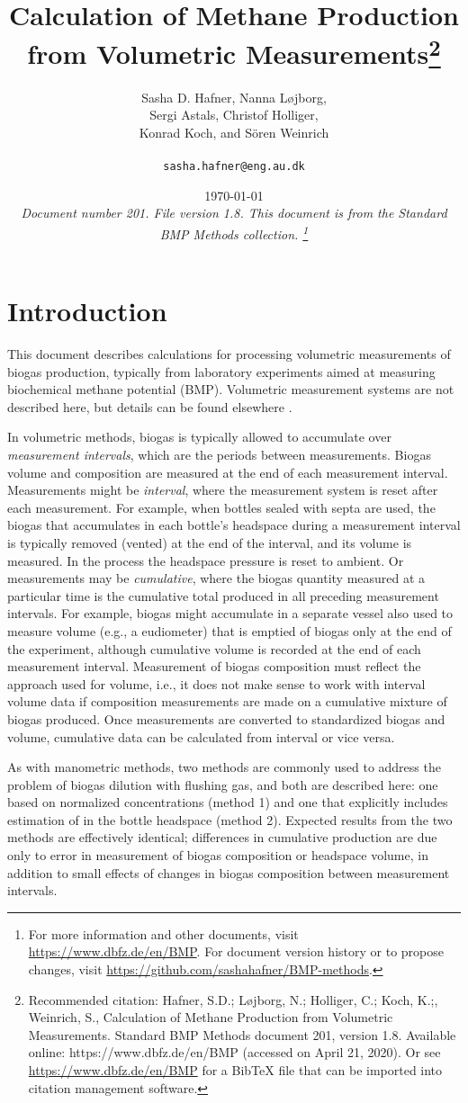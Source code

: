 \documentclass[]{article}
\title {Calculation of Methane Production from Volumetric Measurements\footnote{
  Recommended citation: 
Hafner, S.D.; L{\o}jborg, N.; Holliger, C.; Koch, K.;, Weinrich, S., Calculation of Methane Production from Volumetric Measurements. Standard BMP Methods document 201, version 1.8. Available online: https://www.dbfz.de/en/BMP (accessed on April 21, 2020).
\newline
  Or see \url{https://www.dbfz.de/en/BMP} for a BibTeX file that can be imported into citation management software.
}}
\author{Sasha D. Hafner, Nanna L{\o}jborg, \\ Sergi Astals, Christof Holliger, \\ Konrad Koch, and S{\"o}ren Weinrich\\
\\
\texttt{sasha.hafner@eng.au.dk}
}
\date{\today \\
\bigskip
\textit{
  Document number 201.
  File version 1.8. 
  This document is from the Standard BMP Methods collection.
    \footnote{For more information and other documents, visit \url{https://www.dbfz.de/en/BMP}. 
    For document version history or to propose changes, visit \url{https://github.com/sashahafner/BMP-methods}.}
}
}
\begin{document}
\maketitle

\section{Introduction}
This document describes calculations for processing volumetric measurements of biogas production, typically from laboratory experiments aimed at measuring biochemical methane potential (BMP).
Volumetric measurement systems are not described here, but details can be found elsewhere \citep{owenBioassayMonitoringBiochemical1979,rozziMethodsAssessingMicrobial2004,vdiFermentationOrganicMaterials2016}.

In volumetric methods, biogas is typically allowed to accumulate over \textit{measurement intervals}, which are the periods between measurements.
Biogas volume and composition are measured at the end of each measurement interval.
Measurements might be \textit{interval}, where the measurement system is reset after each measurement.
For example, when bottles sealed with septa are used, the biogas that accumulates in each bottle's headspace during a measurement interval is typically removed (vented) at the end of the interval, and its volume is measured. 
In the process the headspace pressure is reset to ambient.
Or measurements may be \textit{cumulative}, where the biogas quantity measured at a particular time is the cumulative total produced in all preceding measurement intervals.
For example, biogas might accumulate in a separate vessel also used to measure volume (e.g., a eudiometer) that is emptied of biogas only at the end of the experiment, although cumulative volume is recorded at the end of each measurement interval.
Measurement of biogas composition must reflect the approach used for volume, i.e., it does not make sense to work with interval volume data if composition measurements are made on a cumulative mixture of biogas produced.
Once measurements are converted to standardized biogas and  volume, cumulative data can be calculated from interval or vice versa.

As with manometric methods, two methods are commonly used to address the problem of biogas dilution with flushing gas, and both are described here: one based on normalized  concentrations (method 1) and one that explicitly includes estimation of  in the bottle headspace (method 2).
Expected results from the two methods are effectively identical; differences in cumulative  production are due only to error in measurement of biogas composition or headspace volume, in addition to small effects of changes in biogas composition between measurement intervals.
\end{document}

